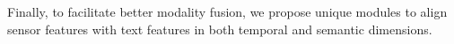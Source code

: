 \documentclass[letterpaper]{article} %
\begin{document}
Finally, to facilitate better modality fusion, we propose unique modules to align sensor features with text features in both temporal and semantic dimensions.
\end{document}

